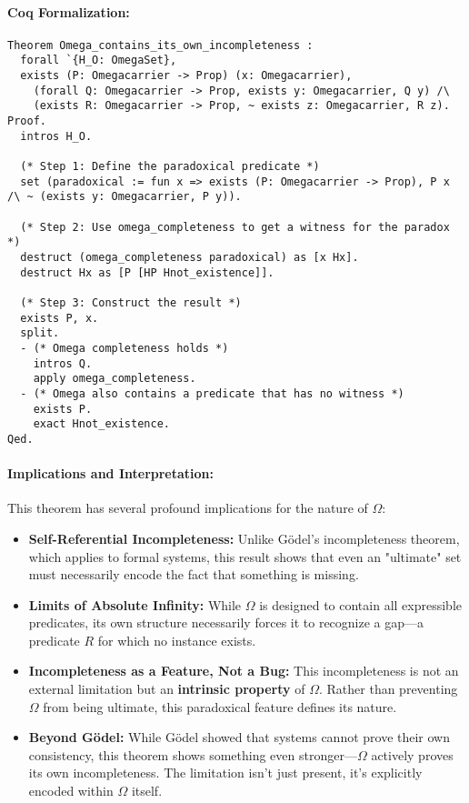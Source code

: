 \documentclass[12pt]{article}
\begin{document}
\paragraph{Coq Formalization:}
\begin{lstlisting}[language=Coq]
Theorem Omega_contains_its_own_incompleteness :
  forall `{H_O: OmegaSet},
  exists (P: Omegacarrier -> Prop) (x: Omegacarrier),
    (forall Q: Omegacarrier -> Prop, exists y: Omegacarrier, Q y) /\
    (exists R: Omegacarrier -> Prop, ~ exists z: Omegacarrier, R z).
Proof.
  intros H_O.

  (* Step 1: Define the paradoxical predicate *)
  set (paradoxical := fun x => exists (P: Omegacarrier -> Prop), P x /\ ~ (exists y: Omegacarrier, P y)).

  (* Step 2: Use omega_completeness to get a witness for the paradox *)
  destruct (omega_completeness paradoxical) as [x Hx].
  destruct Hx as [P [HP Hnot_existence]].

  (* Step 3: Construct the result *)
  exists P, x.
  split.
  - (* Omega completeness holds *)
    intros Q.
    apply omega_completeness.
  - (* Omega also contains a predicate that has no witness *)
    exists P.
    exact Hnot_existence.
Qed.
\end{lstlisting}

\paragraph{Implications and Interpretation:}
This theorem has several profound implications for the nature of \( \Omega \):

\begin{itemize}
    \item \textbf{Self-Referential Incompleteness:} Unlike Gödel’s incompleteness theorem, which applies to formal systems, this result shows that even an "ultimate" set must necessarily encode the fact that something is missing.
    \item \textbf{Limits of Absolute Infinity:} While \( \Omega \) is designed to contain all expressible predicates, its own structure necessarily forces it to recognize a gap—a predicate \( R \) for which no instance exists.
    \item \textbf{Incompleteness as a Feature, Not a Bug:} This incompleteness is not an external limitation but an \textbf{intrinsic property} of \( \Omega \). Rather than preventing \( \Omega \) from being ultimate, this paradoxical feature defines its nature.
    \item \textbf{Beyond Gödel:} While Gödel showed that systems cannot prove their own consistency, this theorem shows something even stronger—\( \Omega \) actively proves its own incompleteness. The limitation isn’t just present, it’s explicitly encoded within \( \Omega \) itself.
\end{itemize}
\end{document}
